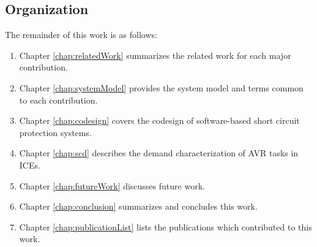 \subsection{Organization}

The remainder of this work is as follows:

\begin{enumerate}
    \item Chapter \ref{chap:relatedWork} summarizes the related work for each major contribution.
    \item Chapter \ref{chap:systemModel} provides the system model and terms common to each contribution.
    \item Chapter \ref{chap:codesign} covers the codesign of software-based short circuit protection systems.
    \item Chapter \ref{chap:scd} describes the demand characterization of AVR tasks in ICEs.
    \item Chapter \ref{chap:futureWork} discusses future work.
    \item Chapter \ref{chap:conclusion} summarizes and concludes this work.
    \item Chapter \ref{chap:publicationList} lists the publications which contributed to this work.
\end{enumerate}